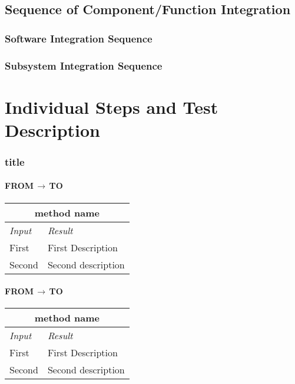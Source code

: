 \documentclass[11pt,a4paper]{report}
\begin{document}
\section{Sequence of Component/Function Integration}
\subsection{Software Integration Sequence}
\subsection{Subsystem Integration Sequence}
\chapter{Individual Steps and Test Description}
\subsection{title}
\subsubsection{FROM$\,\to\,$TO}
\begin{tabularx}{\textwidth}{|X|X|}
	\hline
	\multicolumn{2}{|c|}{\textbf{method name}}\\
	\hline
	\textit{Input} & \textit{Result}\\
	\hline
	First & First Description\\
	\hline
	Second & Second description\\
	\hline
\end{tabularx}
\subsubsection{FROM$\,\to\,$TO}
\begin{tabularx}{\textwidth}{|X|X|}
	\hline
	\multicolumn{2}{|c|}{\textbf{method name}}\\
	\hline
	\textit{Input} & \textit{Result}\\
	\hline
	First & First Description\\
	\hline
	Second & Second description\\
	\hline
\end{tabularx}
\end{document}
